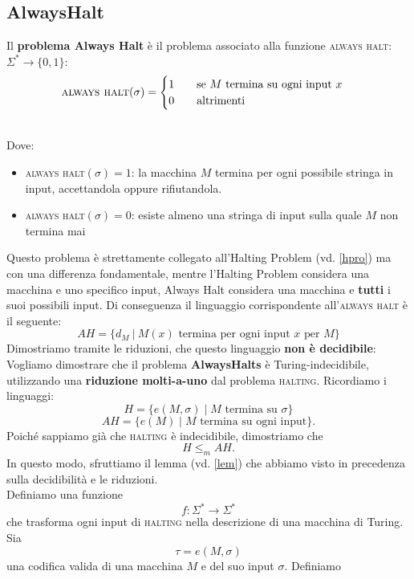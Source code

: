 \subsection{AlwaysHalt}
\colorbox{SALZO}{\parbox{\dimexpr\linewidth-2\fboxsep}{\begin{definition}
   Il \textbf{problema Always Halt} è il problema associato alla funzione \textsc{always halt}: $\Sigma^*\to \{0,1 \}$:
   \[   \textsc{always halt}(\sigma) = \begin{cases}
    1 \qquad \text{se } M \text{ termina su ogni input } x \\
    0 \qquad \text{altrimenti}
   \end{cases}         \]
\end{definition}}}\smallskip\\
Dove:
\begin{itemize}
    \item \textsc{always halt}$(\sigma) = 1$: la macchina $M$ termina per ogni possibile stringa in input, accettandola oppure rifiutandola.
    \item \textsc{always halt}$(\sigma) = 0$: esiste almeno una stringa di input sulla quale $M$ non termina mai
\end{itemize}
Questo problema è strettamente collegato all'Halting Problem (vd. \ref{hpro}) ma con una differenza fondamentale, mentre l'Halting Problem considera una macchina e uno specifico input, Always Halt considera una macchina e \textbf{tutti}
i suoi possibili input. Di conseguenza il linguaggio corrispondente all'\textsc{always halt} è il seguente:
\[     AH = \{  d_M \ |\ M(x) \text{ termina per ogni input } x \text{ per }  M\}   \]
Dimostriamo tramite le riduzioni, che questo linguaggio \textbf{non è decidibile}:\smallskip\\
Vogliamo dimostrare che il problema \textbf{AlwaysHalts} è Turing-indecidibile, utilizzando una \textbf{riduzione molti-a-uno} dal problema \textsc{halting}.
Ricordiamo i linguaggi:
\[
H=\{e(M,\sigma)\mid M\text{ termina su }\sigma\}
\]
\[
AH=\{e(M)\mid M\text{ termina su ogni input}\}.
\]
Poiché sappiamo già che \textsc{halting} è indecidibile, dimostriamo che
\[
\boxed{H\le_m AH}.
\]
In questo modo, sfruttiamo il lemma (vd. \ref{lem}) che abbiamo visto in precedenza sulla decidibilità e le riduzioni.\\
Definiamo una funzione
\[
f:\Sigma^*\rightarrow\Sigma^*
\]
che trasforma ogni input di \textsc{halting} nella descrizione di una macchina di Turing. Sia
\[
\tau=e(M,\sigma)
\]
una codifica valida di una macchina $M$ e del suo input $\sigma$. Definiamo
